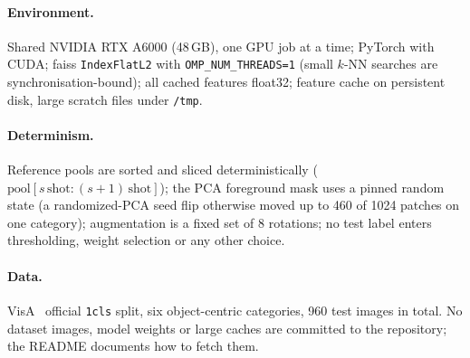 \paragraph{Environment.}
Shared NVIDIA RTX A6000 (48\,GB), one GPU job at a time; PyTorch with CUDA; faiss
\texttt{IndexFlatL2} with \texttt{OMP\_NUM\_THREADS=1} (small $k$-NN searches are
synchronisation-bound); all cached features float32; feature cache on persistent disk,
large scratch files under \texttt{/tmp}.

\paragraph{Determinism.}
Reference pools are sorted and sliced deterministically
($\text{pool}[s\,\text{shot}:(s{+}1)\,\text{shot}]$); the PCA foreground mask uses a pinned
random state (a randomized-PCA seed flip otherwise moved up to 460 of 1024 patches on one
category); augmentation is a fixed set of 8 rotations; no test label enters thresholding,
weight selection or any other choice.

\paragraph{Data.}
VisA~\cite{zou2022spot} official \texttt{1cls} split, six object-centric categories, 960 test
images in total. No dataset images, model weights or large caches are committed to the
repository; the README documents how to fetch them.
